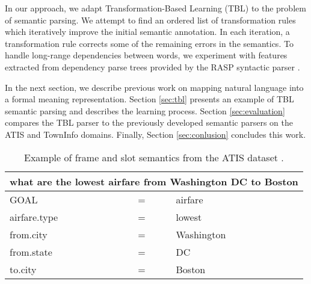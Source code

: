 \documentclass{article}
\begin{document}

In our approach, we adapt Transformation-Based Learning (TBL) \cite{brill95} to the problem of semantic parsing. We attempt to find an ordered list of transformation rules which iteratively improve the initial semantic annotation. 
In each iteration, a transformation rule corrects some of the remaining errors in the semantics.
To handle long-range dependencies between words, we experiment with features extracted from dependency parse trees provided by the RASP syntactic parser \cite{rasp06}.


In the next section, we describe previous work on mapping natural language into a formal meaning representation. Section \ref{sec:tbl} presents an example of TBL semantic parsing and describes the learning process. Section \ref{sec:evaluation} compares the TBL parser to the previously developed semantic parsers on the ATIS \cite{atis94} and TownInfo \cite{mairesse09} domains. Finally, Section \ref{sec:conlusion} concludes this work.

\begin{table}
\begin{center}
\begin{tabular}{lll} 
  \multicolumn{3}{l}{what are the lowest airfare from Washington DC to Boston} \\
  \hline
  GOAL          & = & airfare \\
  airfare.type  & = & lowest \\
  from.city     & = & Washington \\
  from.state    & = & DC \\
  to.city       & = & Boston \\
\end{tabular} 
\end{center}
\vspace{-0.5cm}
\caption{Example of frame and slot semantics from the ATIS dataset \cite{atis94}.}
\label{tbl:sem:example}
\end{table}
\end{document}
